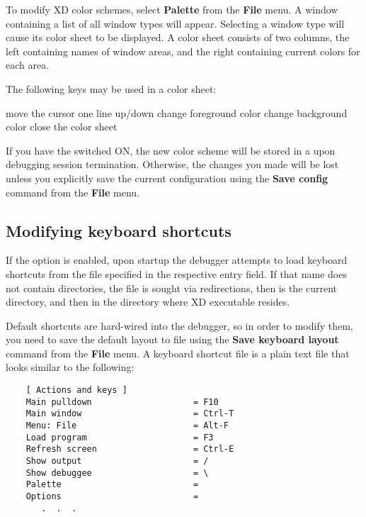 To modify XD color schemes, select {\bf Palette} from the {\bf File} menu.
A window containing a list of all window types will appear.
Selecting a window type will cause its color sheet to be displayed.
A color sheet consists of two columns, the left containing names of window
areas, and the right containing current colors for each area.

The following keys may be used in a color sheet:

\KeyListBegin{10 cm}
          {move the cursor one line up/down}
       {change foreground color}
  {change background color}
              {close the color sheet}
\KeyListEnd

If you have the 
switched ON, the new color scheme will be stored in a
upon debugging session termination. Otherwise, the changes you made
will be lost unless you explicitly save the current configuration
using the {\bf Save config} command from the {\bf File} menu.

\subsection{Modifying keyboard shortcuts}
\label{dialog:options:shortcuts}

If the option  is enabled,
upon startup the debugger attempts to load keyboard shortcuts from the
file specified in the respective entry field. If that name does not contain
directories, the file is sought via redirections, then is the current directory,
and then in the directory where XD executable resides.

Default shortcuts are hard-wired into the debugger, so in order to modify
them, you need to save the default layout to file using the
{\bf Save keyboard layout} command from the {\bf File} menu. A
keyboard shortcut file is a plain text file that looks similar to
the following:

\begin{verbatim}
    [ Actions and keys ]
    Main pulldown                    = F10
    Main window                      = Ctrl-T
    Menu: File                       = Alt-F
    Load program                     = F3
    Refresh screen                   = Ctrl-E
    Show output                      = /
    Show debuggee                    = \
    Palette                          = 
    Options                          = 
       .  .  .
\end{verbatim}

